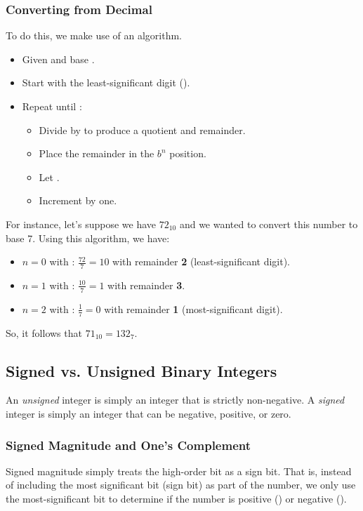 \documentclass[letterpaper]{article}
\begin{document}
\subsubsection{Converting from Decimal}
To do this, we make use of an algorithm.
\begin{itemize}
    \item Given  and base .
    \item Start with the least-significant digit (). 
    \item Repeat until :
    \begin{itemize}
        \item Divide  by  to produce a quotient and remainder. 
        \item Place the remainder in the $b^n$ position. 
        \item Let . 
        \item Increment  by one. 
    \end{itemize}
\end{itemize}

For instance, let's suppose we have $72_{10}$ and we wanted to convert this number to base 7. Using this algorithm, we have:
\begin{itemize}
    \item $n = 0$ with : $\frac{72}{7} = 10$ with remainder \textbf{2} (least-significant digit).
    \item $n = 1$ with : $\frac{10}{7} = 1$ with remainder \textbf{3}. 
    \item $n = 2$ with : $\frac{1}{7} = 0$ with remainder \textbf{1} (most-significant digit).
\end{itemize}
So, it follows that $71_{10} = 132_{7}$. 

\subsection{Signed vs. Unsigned Binary Integers}
An \emph{unsigned} integer is simply an integer that is strictly non-negative. A \emph{signed} integer is simply an integer that can be negative, positive, or zero.

\subsubsection{Signed Magnitude and One's Complement}
Signed magnitude simply treats the high-order bit as a sign bit. That is, instead of including the most significant bit (sign bit) as part of the number, we only use the most-significant bit to determine if the number is positive () or negative (). 
\end{document}
